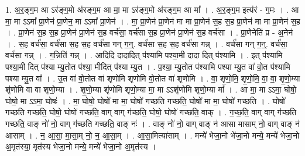 \documentclass[17pt]{extarticle}
\begin{document}
1. अ॒र॒ङ्ग॒म आ ऽर॑ङ्ग॒मो अ॑रङ्ग॒म आ मा॒ मा ऽर॑ङ्ग॒मो अ॑रङ्ग॒म आ मा᳚ । . अ॒र॒ङ्ग॒म इत्य॑रं - ग॒मः । . आ मा॒ मा ऽऽमा᳚ प्रा॒णेन॑ प्रा॒णेन॒ मा ऽऽमा᳚ प्रा॒णेन॑ । . मा॒ प्रा॒णेन॑ प्रा॒णेन॑ मा मा प्रा॒णेन॑ स॒ह स॒ह प्रा॒णेन॑ मा मा प्रा॒णेन॑ स॒ह । . प्रा॒णेन॑ स॒ह स॒ह प्रा॒णेन॑ प्रा॒णेन॑ स॒ह वर्च॑सा॒ वर्च॑सा स॒ह प्रा॒णेन॑ प्रा॒णेन॑ स॒ह वर्च॑सा । . प्रा॒णेनेति॑ प्र - अ॒नेन॑ । . स॒ह वर्च॑सा॒ वर्च॑सा स॒ह स॒ह वर्च॑सा गन् ग॒न्॒. वर्च॑सा स॒ह स॒ह वर्च॑सा गन्न् । . वर्च॑सा गन् ग॒न्॒. वर्च॑सा॒ वर्च॑सा गन्न् । . ग॒न्निति॑ गन्न् । . आदिदि दादादित् प॑श्यामि पश्या॒मी दादा दित् प॑श्यामि । . इत् प॑श्यामि पश्या॒मी दित् प॑श्या म्यु॒तोत प॑श्या॒ मीदित् प॑श्या म्यु॒त । . प॒श्या॒ म्यु॒तोत प॑श्यामि पश्या म्यु॒त वा॑ वो॒त प॑श्यामि पश्या म्यु॒त वा᳚ । . उ॒त वा॑ वो॒तोत वा॑ शृणोमि शृणोमि वो॒तोत वा॑ शृणोमि । . वा॒ शृ॒णो॒मि॒ शृ॒णो॒मि॒ वा॒ वा॒ शृ॒णो॒म्या शृ॑णोमि वा वा शृणो॒म्या । . शृ॒णो॒म्या शृ॑णोमि शृणो॒म्या मा॒ मा ऽऽशृ॑णोमि शृणो॒म्या मा᳚ । . आ मा॒ मा ऽऽमा॒ घोषो॒ घोषो॒ मा ऽऽमा॒ घोषः॑ । . मा॒ घोषो॒ घोषो॑ मा मा॒ घोषो॑ गच्छति गच्छति॒ घोषो॑ मा मा॒ घोषो॑ गच्छति । . घोषो॑ गच्छति गच्छति॒ घोषो॒ घोषो॑ गच्छति॒ वाग् वाग् ग॑च्छति॒ घोषो॒ घोषो॑ गच्छति॒ वाक् । . ग॒च्छ॒ति॒ वाग् वाग् ग॑च्छति गच्छति॒ वाङ् नो॑ नो॒ वाग् ग॑च्छति गच्छति॒ वाङ् नः॑ । . वाङ् नो॑ नो॒ वाग् वाङ् न॑ आसा मासाम् नो॒ वाग् वाङ् न॑ आसाम् । . न॒ आ॒सा॒ मा॒सा॒म् नो॒ न॒ आ॒सा॒म् । . आ॒सा॒मित्या॑साम् । . मन्ये॑ भेजा॒नो भे॑जा॒नो मन्ये॒ मन्ये॑ भेजा॒नो अ॒मृत॑स्या॒ मृत॑स्य भेजा॒नो मन्ये॒ मन्ये॑ भेजा॒नो अ॒मृत॑स्य । \newline
\end{document}
